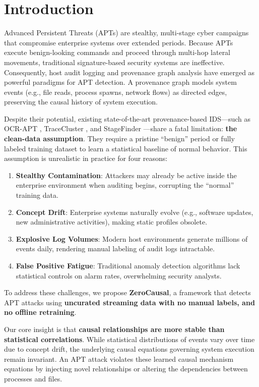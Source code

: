 \section{Introduction}
Advanced Persistent Threats (APTs) are stealthy, multi-stage cyber campaigns that compromise enterprise systems over extended periods. Because APTs execute benign-looking commands and proceed through multi-hop lateral movements, traditional signature-based security systems are ineffective. Consequently, host audit logging and provenance graph analysis have emerged as powerful paradigms for APT detection. A provenance graph models system events (e.g., file reads, process spawns, network flows) as directed edges, preserving the causal history of system execution.

Despite their potential, existing state-of-the-art provenance-based IDS---such as OCR-APT \cite{ocrapt2025}, TraceCluster \cite{tracecluster2026}, and StageFinder \cite{stagefinder2026}---share a fatal limitation: \textbf{the clean-data assumption}. They require a pristine ``benign'' period or fully labeled training dataset to learn a statistical baseline of normal behavior. This assumption is unrealistic in practice for four reasons:
\begin{enumerate}
\item \textbf{Stealthy Contamination}: Attackers may already be active inside the enterprise environment when auditing begins, corrupting the ``normal'' training data.
\item \textbf{Concept Drift}: Enterprise systems naturally evolve (e.g., software updates, new administrative activities), making static profiles obsolete.
\item \textbf{Explosive Log Volumes}: Modern host environments generate millions of events daily, rendering manual labeling of audit logs intractable.
\item \textbf{False Positive Fatigue}: Traditional anomaly detection algorithms lack statistical controls on alarm rates, overwhelming security analysts.
\end{enumerate}

To address these challenges, we propose \textbf{ZeroCausal}, a framework that detects APT attacks using \textbf{uncurated streaming data with no manual labels, and no offline retraining}.

Our core insight is that \textbf{causal relationships are more stable than statistical correlations}. While statistical distributions of events vary over time due to concept drift, the underlying causal equations governing system execution remain invariant. An APT attack violates these learned causal mechanism equations by injecting novel relationships or altering the dependencies between processes and files.

